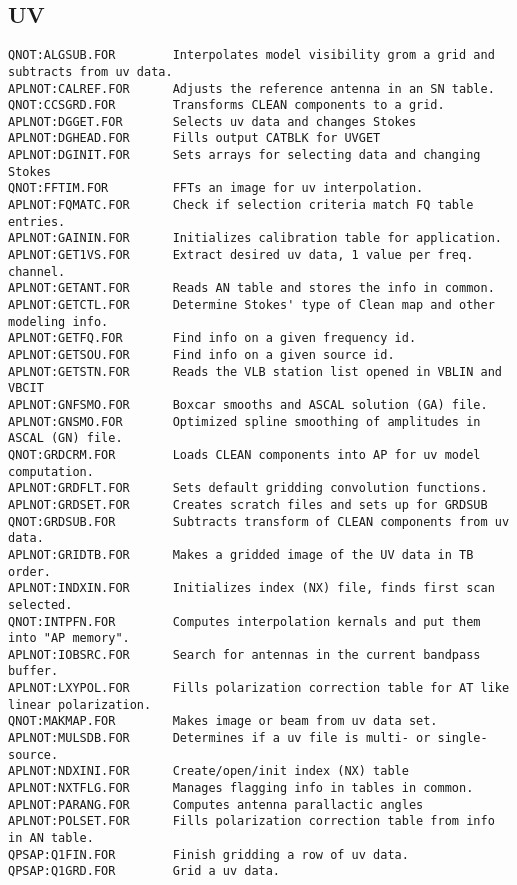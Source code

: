 \subsection{UV}
\begin{verbatim}
QNOT:ALGSUB.FOR        Interpolates model visibility grom a grid and subtracts from uv data.
APLNOT:CALREF.FOR      Adjusts the reference antenna in an SN table.
QNOT:CCSGRD.FOR        Transforms CLEAN components to a grid.
APLNOT:DGGET.FOR       Selects uv data and changes Stokes
APLNOT:DGHEAD.FOR      Fills output CATBLK for UVGET
APLNOT:DGINIT.FOR      Sets arrays for selecting data and changing Stokes
QNOT:FFTIM.FOR         FFTs an image for uv interpolation.
APLNOT:FQMATC.FOR      Check if selection criteria match FQ table entries.
APLNOT:GAININ.FOR      Initializes calibration table for application.
APLNOT:GET1VS.FOR      Extract desired uv data, 1 value per freq. channel.
APLNOT:GETANT.FOR      Reads AN table and stores the info in common.
APLNOT:GETCTL.FOR      Determine Stokes' type of Clean map and other modeling info.
APLNOT:GETFQ.FOR       Find info on a given frequency id.
APLNOT:GETSOU.FOR      Find info on a given source id.
APLNOT:GETSTN.FOR      Reads the VLB station list opened in VBLIN and VBCIT
APLNOT:GNFSMO.FOR      Boxcar smooths and ASCAL solution (GA) file.
APLNOT:GNSMO.FOR       Optimized spline smoothing of amplitudes in ASCAL (GN) file.
QNOT:GRDCRM.FOR        Loads CLEAN components into AP for uv model computation.
APLNOT:GRDFLT.FOR      Sets default gridding convolution functions.
APLNOT:GRDSET.FOR      Creates scratch files and sets up for GRDSUB
QNOT:GRDSUB.FOR        Subtracts transform of CLEAN components from uv data.
APLNOT:GRIDTB.FOR      Makes a gridded image of the UV data in TB order.
APLNOT:INDXIN.FOR      Initializes index (NX) file, finds first scan selected.
QNOT:INTPFN.FOR        Computes interpolation kernals and put them into "AP memory".
APLNOT:IOBSRC.FOR      Search for antennas in the current bandpass buffer.
APLNOT:LXYPOL.FOR      Fills polarization correction table for AT like linear polarization.
QNOT:MAKMAP.FOR        Makes image or beam from uv data set.
APLNOT:MULSDB.FOR      Determines if a uv file is multi- or single- source.
APLNOT:NDXINI.FOR      Create/open/init index (NX) table
APLNOT:NXTFLG.FOR      Manages flagging info in tables in common.
APLNOT:PARANG.FOR      Computes antenna parallactic angles
APLNOT:POLSET.FOR      Fills polarization correction table from info in AN table.
QPSAP:Q1FIN.FOR        Finish gridding a row of uv data.
QPSAP:Q1GRD.FOR        Grid a uv data.

\end{verbatim}
